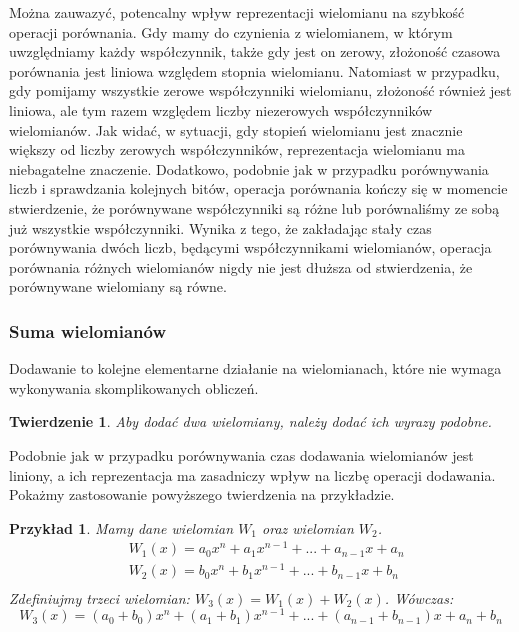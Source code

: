 \documentclass[twoside,a4paper]{book}
\newtheorem{theorem}{Twierdzenie}
\newtheorem{example}{Przykład}
\begin{document}
Można zauwazyć, potencalny wpływ reprezentacji wielomianu na szybkość operacji porównania. Gdy mamy do czynienia z wielomianem, w którym uwzględniamy każdy współczynnik, także gdy jest on zerowy, złożoność czasowa porównania jest liniowa względem stopnia wielomianu. Natomiast w przypadku, gdy pomijamy wszystkie zerowe współczynniki wielomianu, złożoność również jest liniowa, ale tym razem względem liczby niezerowych współczynników wielomianów. Jak widać, w sytuacji, gdy stopień wielomianu jest znacznie większy od liczby zerowych współczynników, reprezentacja wielomianu ma niebagatelne znaczenie. \newline
Dodatkowo, podobnie jak w przypadku porównywania liczb i sprawdzania kolejnych bitów, operacja porównania kończy się w momencie stwierdzenie, że porównywane współczynniki są różne lub porównaliśmy ze sobą już wszystkie współczynniki. Wynika z tego, że zakładając stały czas porównywania dwóch liczb, będącymi współczynnikami wielomianów, operacja porównania różnych wielomianów nigdy nie jest dłuższa od stwierdzenia, że porównywane wielomiany są równe.

\subsubsection{Suma wielomianów}

Dodawanie to kolejne elementarne działanie na wielomianach, które nie wymaga wykonywania skomplikowanych obliczeń.

\begin{theorem}
	Aby dodać dwa wielomiany, należy dodać ich wyrazy podobne.
\end{theorem}

Podobnie jak w przypadku porównywania czas dodawania wielomianów jest liniony, a ich reprezentacja ma zasadniczy wpływ na liczbę operacji dodawania. Pokażmy zastosowanie powyższego twierdzenia na przykładzie.

\begin{example}
	Mamy dane wielomian $W_1$ oraz wielomian $W_2$.
	\begin{equation}
		\begin{split}
			&W_1(x) = a_0x^n + a_1x^{n-1} + ... + a_{n-1}x + a_n \\
			&W_2(x) = b_0x^n + b_1x^{n-1} + ... + b_{n-1}x + b_n \\
		\end{split}
	\end{equation}
	Zdefiniujmy trzeci wielomian: $W_3(x) = W_1(x) + W_2(x)$. Wówczas:
	\begin{equation}
		W_3(x) = (a_0+b_0)x^n + (a_1+b_1)x^{n-1} + ... + (a_{n-1} + b_{n-1})x + a_n + b_n
	\end{equation}
\end{example}
\end{document}
